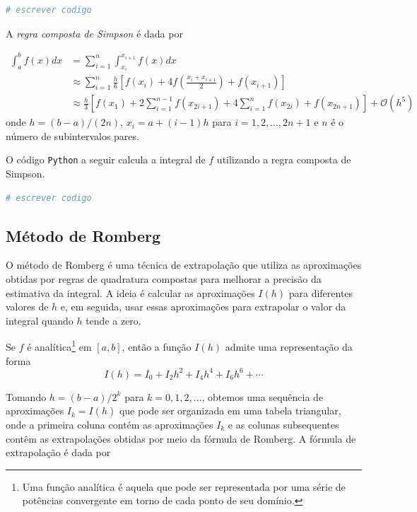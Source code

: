\documentclass{article}
\begin{document}
\begin{lstlisting}[language=Python, caption={Método do trapézio composto}]
    # escrever codigo
\end{lstlisting}

A \emph{regra composta de Simpson} é dada por

\begin{align}
    \int_{a}^{b} f(x) dx &= \sum_{i=1}^{n} \int_{x_i}^{x_{i+1}} f(x) dx \\
    &\approx \sum_{i=1}^{n} \frac{h}{6} [f(x_i) + 4f\left(\frac{x_i + x_{i+1}}{2}\right) + f(x_{i+1})] \\
    &\approx \frac{h}{3} \left[f(x_1) + 2\sum_{i=1}^{n-1} f(x_{2i+1}) + 4\sum_{i=1}^{n} f(x_{2i}) + f(x_{2n+1})\right] + \mathcal{O}(h^5)
\end{align}
onde \(h = (b-a)/(2n)\), \(x_i = a + (i-1)h\) para \(i = 1, 2, \ldots, 2n+1\) e \(n\) é o número de subintervalos pares.

O código \texttt{Python} a seguir calcula a integral de \(f\) utilizando a regra composta de Simpson.

\begin{lstlisting}[language=Python, caption={Método de Simpson composto}]
    # escrever codigo
\end{lstlisting}

\subsection{Método de Romberg}

O método de Romberg é uma técnica de extrapolação que utiliza as aproximações obtidas por regras de quadratura compostas para melhorar a precisão da estimativa da integral. A ideia é calcular as aproximações \(I(h)\) para diferentes valores de \(h\) e, em seguida, usar essas aproximações para extrapolar o valor da integral quando \(h\) tende a zero.

\begin{thm}
    Se \(f\) é analítica\footnote{Uma função analítica é aquela que pode ser representada por uma série de potências convergente em torno de cada ponto de seu domínio.} em \([a, b]\), então a função \(I(h)\) admite uma representação da forma
    \begin{equation}
        I(h) = I_0 + I_2 h^2 + I_4 h^4 + I_6 h^6 + \cdots
    \end{equation}
\end{thm}
Tomando \(h = (b-a)/2^k\) para \(k = 0, 1, 2, \ldots\), obtemos uma sequência de aproximações \(I_k = I(h)\) que pode ser organizada em uma tabela triangular, onde a primeira coluna contém as aproximações \(I_k\) e as colunas subsequentes contêm as extrapolações obtidas por meio da fórmula de Romberg. A fórmula de extrapolação é dada por
\end{document}
